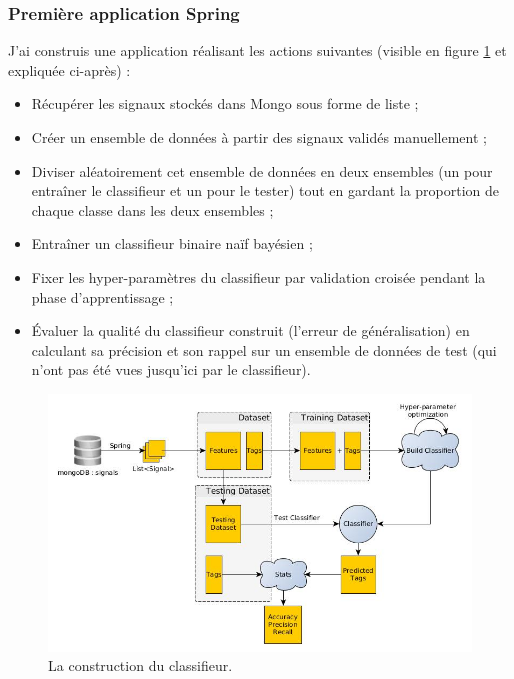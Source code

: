             \subsubsection{Première application Spring}
                J'ai construis une application réalisant les actions suivantes (visible en figure \ref{fig:classif_building} et expliquée ci-après) :
            \begin{itemize}
                \item Récupérer les signaux stockés dans Mongo sous forme de liste ;
                \item Créer un ensemble de données à partir des signaux validés manuellement ;
                \item Diviser aléatoirement cet ensemble de données en deux ensembles (un pour entraîner le classifieur et un pour le tester) tout en gardant la proportion de chaque classe dans les deux ensembles ;
                \item Entraîner un classifieur binaire naïf bayésien ;
                \item Fixer les hyper-paramètres du classifieur par validation croisée pendant la phase d'apprentissage ;
                \item Évaluer la qualité du classifieur construit (l'erreur de généralisation) en calculant sa précision et son rappel sur un ensemble de données de test (qui n'ont pas \og été vues \fg jusqu'ici par le classifieur).
            \end{itemize}

            \begin{figure}[h!]
                \centering
                \includegraphics[width=\textwidth]{images/classifier_building.jpg}
                \caption{La construction du classifieur.}
                \label{fig:classif_building}
            \end{figure}


